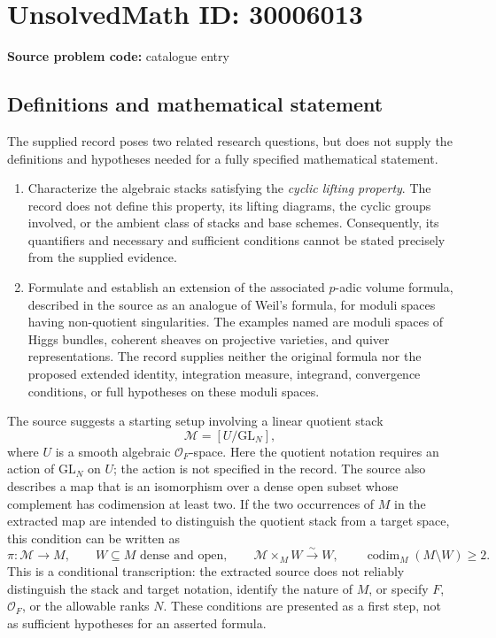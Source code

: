 \documentclass[11pt]{article}
\begin{document}
\section*{UnsolvedMath ID: 30006013}
\textbf{Source problem code:} catalogue entry
\subsection{Definitions and mathematical statement}
The supplied record poses two related research questions, but does not supply the definitions and hypotheses needed for a fully specified mathematical statement.

\begin{enumerate}
\item Characterize the algebraic stacks satisfying the \emph{cyclic lifting property}. The record does not define this property, its lifting diagrams, the cyclic groups involved, or the ambient class of stacks and base schemes. Consequently, its quantifiers and necessary and sufficient conditions cannot be stated precisely from the supplied evidence.
\item Formulate and establish an extension of the associated \(p\)-adic volume formula, described in the source as an analogue of Weil's formula, for moduli spaces having non-quotient singularities. The examples named are moduli spaces of Higgs bundles, coherent sheaves on projective varieties, and quiver representations. The record supplies neither the original formula nor the proposed extended identity, integration measure, integrand, convergence conditions, or full hypotheses on these moduli spaces.
\end{enumerate}

The source suggests a starting setup involving a linear quotient stack
\[
\mathcal M=[U/\mathrm{GL}_N],
\]
where \(U\) is a smooth algebraic \(\mathcal O_F\)-space. Here the quotient notation requires an action of \(\mathrm{GL}_N\) on \(U\); the action is not specified in the record. The source also describes a map that is an isomorphism over a dense open subset whose complement has codimension at least two. If the two occurrences of \(M\) in the extracted map are intended to distinguish the quotient stack from a target space, this condition can be written as
\[
\pi:\mathcal M\longrightarrow M,\qquad
W\subseteq M\text{ dense and open},\qquad
\mathcal M\times_M W\xrightarrow{\sim}W,\qquad
\operatorname{codim}_M(M\setminus W)\geq 2.
\]
This is a conditional transcription: the extracted source does not reliably distinguish the stack and target notation, identify the nature of \(M\), or specify \(F\), \(\mathcal O_F\), or the allowable ranks \(N\). These conditions are presented as a first step, not as sufficient hypotheses for an asserted formula.
\end{document}
